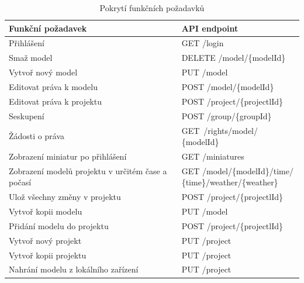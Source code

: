 \documentclass[thesis=B,czech]{FITthesis}[2012/06/26]
\begin{document}
        \begin{table}[h!]
        	\caption{Pokrytí funkčních požadavků} \label{tabulkaPokryti}
        	\begin{tabular}{| p{6cm} | p{5cm} |}\hline
        		Funkční požadavek & API endpoint
        		\tabularnewline \hline \hline
                Přihlášení & GET /login
            	\tabularnewline \hline
                Smaž model &	DELETE /model/\{modelId\}
            	\tabularnewline \hline
                Vytvoř nový model &	PUT /model
            	\tabularnewline \hline
                Editovat práva k modelu &	POST /model/\{modelId\}
            	\tabularnewline \hline
                Editovat práva k projektu &	POST /project/\{projectlId\}
            	\tabularnewline \hline
                Seskupení & POST /group/\{groupId\}
            	\tabularnewline \hline
                Žádosti o práva & GET~/rights/model/ \{modelId\}
            	\tabularnewline \hline
                Zobrazení miniatur po přihlášení & GET /miniatures
            	\tabularnewline \hline
                Zobrazení modelů projektu v určitém čase a počasí &
                \parbox[t]{5cm}{GET /model/\{modelId\}/time/\\\{time\}/weather/\{weather\}}
            	\tabularnewline \hline
                Ulož všechny změny v projektu &	POST /project/\{projectlId\}
            	\tabularnewline \hline
                Vytvoř kopii modelu	& PUT /model
            	\tabularnewline \hline
                Přidání modelu do projektu & POST /project/\{projectlId\}
            	\tabularnewline \hline
                Vytvoř nový projekt & PUT /project
            	\tabularnewline \hline
                Vytvoř kopii projektu &	PUT /project
            	\tabularnewline \hline
                Nahrání modelu z lokálního zařízení & PUT /project
            	\tabularnewline \hline
            \end{tabular}
        \end{table}
    \newpage
\end{document}

